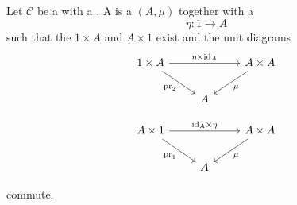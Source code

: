 \begin{definition} \label{definition:monoid_object_in_a_category_with_a_final_object}
    Let $\mathcal{C}$ be a  with a . 
    A  is a  $(A,\mu)$ together with a  
    $$
    \eta : 1 \to A
    $$
    such that the  $1 \times A$ and $A \times 1$ exist and the unit diagrams
    $$
    \begin{tikzcd}
    1 \times A
    \arrow[rr, "\eta \times \mathrm{id}_A"]
    \arrow[dr, "\mathrm{pr}_2"']
    && A \times A
    \arrow[dl, "\mu"]
    \\
    & A &
    \end{tikzcd}
    $$

    $$
    \begin{tikzcd}
    A \times 1
    \arrow[rr, "\mathrm{id}_A \times \eta"]
    \arrow[dr, "\mathrm{pr}_1"']
    && A \times A
    \arrow[dl, "\mu"]
    \\
    & A &
    \end{tikzcd}
    $$

    commute.
\end{definition}